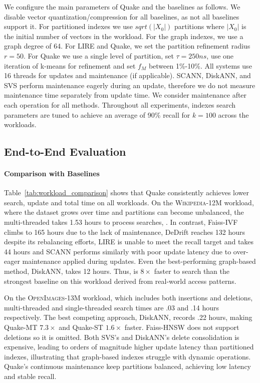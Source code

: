 
We configure the main parameters of Quake and the baselines as follows. We disable vector quantization/compression for all baselines, as not all baselines support it. For partitioned indexes we use $sqrt(|X_0|)$ partitions where $|X_0|$ is the initial number of vectors in the workload. For the graph indexes, we use a graph degree of 64. For LIRE and Quake, we set the partition refinement radius $r=50$. For Quake we use a single level of partition, set $\tau=250ns$, use one iteration of k-means for refinement and set $f_M$ between 1\%-10\%. All systems use 16 threads for updates and maintenance (if applicable). SCANN, DiskANN, and SVS perform maintenance eagerly during an update, therefore we do not measure maintenance time separately from update time. We consider maintenance after each operation for all methods. Throughout all experiments, indexes search parameters are tuned to achieve an average of 90\% recall for $k=100$ across the workloads. 

\subsection{End-to-End Evaluation}

\paragraph{Comparison with Baselines} Table~\ref{tab:workload_comparison} shows that Quake consistently achieves lower search, update and total time on all workloads. On the \textsc{Wikipedia-12M} workload, where the dataset grows over time and partitions can become unbalanced, the multi-threaded  takes 1.53 hours to process searches, . In contrast, Faiss-IVF climbs to 165 hours due to the lack of maintenance, DeDrift reaches 132 hours despite its rebalancing efforts, LIRE is unable to meet the recall target and takes 44 hours and SCANN performs similarly with poor update latency due to over-eager maintenance applied during updates. Even the best-performing graph-based method, DiskANN, takes 12 hours. Thus,  is $8\times$ faster to search than the strongest baseline on this workload derived from real-world access patterns.

On the \textsc{OpenImages-13M} workload, which includes both insertions and deletions,  multi-threaded and single-threaded search times are .03 and .14 hours respectively. The best competing approach, DiskANN, records .22 hours, making Quake-MT $7.3\times$ and Quake-ST $1.6\times$ faster. Faiss-HNSW does not support deletions so it is omitted. Both SVS's and DiskANN’s delete consolidation is expensive, leading to orders of magnitude higher update latency than partitioned indexes, illustrating that graph-based indexes struggle with dynamic operations. Quake’s continuous maintenance keep partitions balanced, achieving low latency and stable recall.

